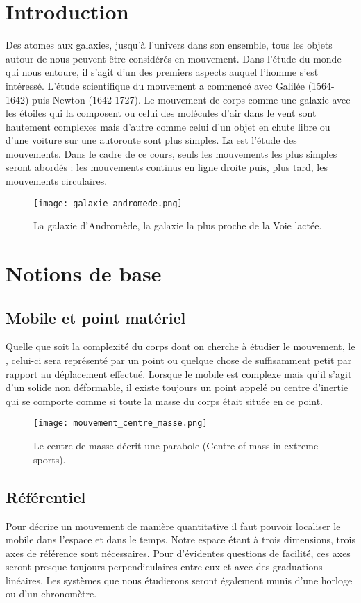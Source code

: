 \chapter{Introduction}
Des atomes aux galaxies, jusqu'à l'univers dans son ensemble, tous les objets autour de nous peuvent être considérés en mouvement. Dans l'étude du monde qui nous entoure, il s'agit d'un des premiers aspects auquel l'homme s'est intéressé. L'étude scientifique du mouvement a commencé avec Galilée (1564-1642) puis Newton (1642-1727). Le mouvement de corps comme une galaxie avec les étoiles qui la composent ou celui des molécules d'air dans le vent sont hautement complexes mais d'autre comme celui d'un objet en chute libre ou d'une voiture sur une autoroute sont plus simples.
La  est l'étude des mouvements. Dans le cadre de ce cours, seuls les mouvements les plus simples seront abordés : les mouvements continus en ligne droite puis, plus tard, les mouvements circulaires.
\begin{figure}[!ht]
    \centering
    \texttt{[image: galaxie\_andromede.png]}
    \caption{La galaxie d'Andromède, la galaxie la plus proche de la Voie lactée. }
    \label{galaxie_andromede}
\end{figure}


\chapter{Notions de base}
\section{Mobile et point matériel}
Quelle que soit la complexité du corps dont on cherche à étudier le mouvement, le , celui-ci sera représenté par un point ou quelque chose de suffisamment petit par rapport au déplacement effectué. Lorsque le mobile est complexe mais qu'il s'agit d'un solide non déformable, il existe toujours un point appelé  ou centre d'inertie qui se comporte comme si toute la masse du corps était située en ce point.
\begin{figure}[!ht]
    \centering
    \texttt{[image: mouvement\_centre\_masse.png]}
    \caption{Le centre de masse décrit une parabole (Centre of mass in extreme sports). }
    \label{mouvement_centre_masse}
\end{figure}

\newpage

\section{Référentiel}
Pour décrire un mouvement de manière quantitative il faut pouvoir localiser le mobile dans l'espace et dans le temps. Notre espace étant à trois dimensions, trois axes de référence sont nécessaires. Pour d'évidentes questions de facilité, ces axes seront presque toujours perpendiculaires entre-eux et avec des graduations linéaires. Les systèmes que nous étudierons seront également munis d'une horloge ou d'un chronomètre.

